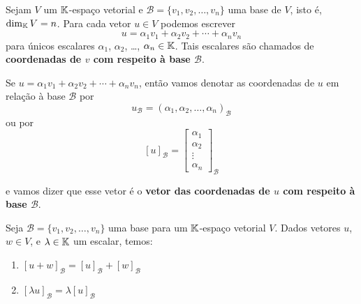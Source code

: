 \documentclass{beamer}
\begin{document}
\begin{frame}
  \begin{definicao}
    Sejam $V$ um $\mathbb{K}$-espaço vetorial  e $\mathcal{B} = \{v_1, v_2, \dots, v_n\}$ uma base de $V$,  isto é, $\dim_{\mathbb{K}}V = n$.  Para cada vetor $u \in V$  podemos escrever
    \[
      u = \alpha_1v_1 + \alpha_2v_2 + \cdots + \alpha_nv_n
    \]
    para únicos escalares  $\alpha_1$, $\alpha_2$, \dots, $\alpha_n \in \mathbb{K}$.  Tais escalares são chamados de \textbf{coordenadas de $v$ com respeito à base $\mathcal{B}$}.
  \end{definicao}
\end{frame}

\begin{frame}
  \begin{notacao}
    Se $u = \alpha_1v_1 + \alpha_2v_2 + \cdots + \alpha_nv_n$,  então vamos denotar as coordenadas de $u$  em relação à base $\mathcal{B}$ por
    \[
      u_\mathcal{B} = (\alpha_1, \alpha_2, \dots, \alpha_n)_\mathcal{B}
    \]
    ou por
    \[
      [u]_\mathcal{B} = \begin{bmatrix}\alpha_1\\\alpha_2\\ \vdots\\ \alpha_n\end{bmatrix}_\mathcal{B}
    \]

    e vamos dizer que esse vetor  é o \textbf{vetor das coordenadas de $u$ com respeito à base $\mathcal{B}$}.
  \end{notacao}
\end{frame}

\begin{frame}
  \begin{teorema}
    Seja $\mathcal{B} = \{v_1, v_2, \dots, v_n\}$ uma base  para um $\mathbb{K}$-espaço vetorial $V$.  Dados vetores $u$, $w \in V$,  e $\lambda \in \mathbb{K}$ um escalar, temos:
    \begin{enumerate}[label={\roman*})]
      \vspace{.2cm}

      \item $[u + w]_\mathcal{B}  = [u]_\mathcal{B}  + [w]_\mathcal{B}$

      \vspace{1cm}

      \item $[\lambda u]_\mathcal{B}  = \lambda[u]_\mathcal{B}$
    \end{enumerate}
  \end{teorema}
\end{frame}
\end{document}
